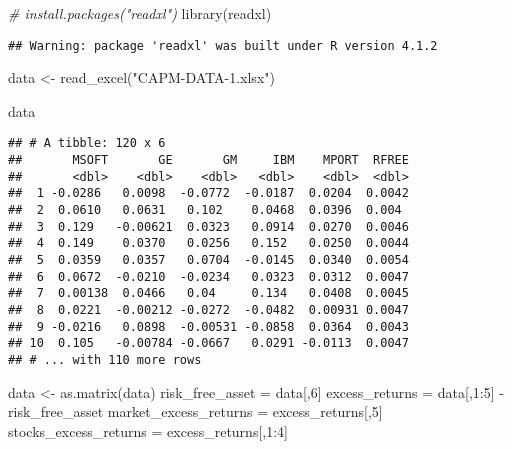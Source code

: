 \documentclass[
]{article}
\author{}
\date{\vspace{-2.5em}}
\newenvironment{Shaded}{\begin{snugshade}}{\end{snugshade}}
\newcommand{\CommentTok}[1]{\textcolor[rgb]{0.56,0.35,0.01}{\textit{#1}}}
\newcommand{\DecValTok}[1]{\textcolor[rgb]{0.00,0.00,0.81}{#1}}
\newcommand{\FunctionTok}[1]{\textcolor[rgb]{0.00,0.00,0.00}{#1}}
\newcommand{\NormalTok}[1]{#1}
\newcommand{\OtherTok}[1]{\textcolor[rgb]{0.56,0.35,0.01}{#1}}
\newcommand{\SpecialCharTok}[1]{\textcolor[rgb]{0.00,0.00,0.00}{#1}}
\newcommand{\StringTok}[1]{\textcolor[rgb]{0.31,0.60,0.02}{#1}}
\begin{document}
\begin{Shaded}
\begin{Highlighting}[]
\CommentTok{\# install.packages("readxl")}
\FunctionTok{library}\NormalTok{(readxl)}
\end{Highlighting}
\end{Shaded}

\begin{verbatim}
## Warning: package 'readxl' was built under R version 4.1.2
\end{verbatim}

\begin{Shaded}
\begin{Highlighting}[]
\NormalTok{data }\OtherTok{\textless{}{-}} \FunctionTok{read\_excel}\NormalTok{(}\StringTok{"CAPM{-}DATA{-}1.xlsx"}\NormalTok{)}

\NormalTok{data}
\end{Highlighting}
\end{Shaded}

\begin{verbatim}
## # A tibble: 120 x 6
##       MSOFT       GE       GM     IBM    MPORT  RFREE
##       <dbl>    <dbl>    <dbl>   <dbl>    <dbl>  <dbl>
##  1 -0.0286   0.0098  -0.0772  -0.0187  0.0204  0.0042
##  2  0.0610   0.0631   0.102    0.0468  0.0396  0.004 
##  3  0.129   -0.00621  0.0323   0.0914  0.0270  0.0046
##  4  0.149    0.0370   0.0256   0.152   0.0250  0.0044
##  5  0.0359   0.0357   0.0704  -0.0145  0.0340  0.0054
##  6  0.0672  -0.0210  -0.0234   0.0323  0.0312  0.0047
##  7  0.00138  0.0466   0.04     0.134   0.0408  0.0045
##  8  0.0221  -0.00212 -0.0272  -0.0482  0.00931 0.0047
##  9 -0.0216   0.0898  -0.00531 -0.0858  0.0364  0.0043
## 10  0.105   -0.00784 -0.0667   0.0291 -0.0113  0.0047
## # ... with 110 more rows
\end{verbatim}

\begin{Shaded}
\begin{Highlighting}[]
\NormalTok{data }\OtherTok{\textless{}{-}} \FunctionTok{as.matrix}\NormalTok{(data)}
\NormalTok{risk\_free\_asset }\OtherTok{=}\NormalTok{ data[,}\DecValTok{6}\NormalTok{]}
\NormalTok{excess\_returns }\OtherTok{=}\NormalTok{ data[,}\DecValTok{1}\SpecialCharTok{:}\DecValTok{5}\NormalTok{] }\SpecialCharTok{{-}}\NormalTok{ risk\_free\_asset}
\NormalTok{market\_excess\_returns }\OtherTok{=}\NormalTok{ excess\_returns[,}\DecValTok{5}\NormalTok{]}
\NormalTok{stocks\_excess\_returns }\OtherTok{=}\NormalTok{ excess\_returns[,}\DecValTok{1}\SpecialCharTok{:}\DecValTok{4}\NormalTok{]}
\end{Highlighting}
\end{Shaded}
\end{document}
